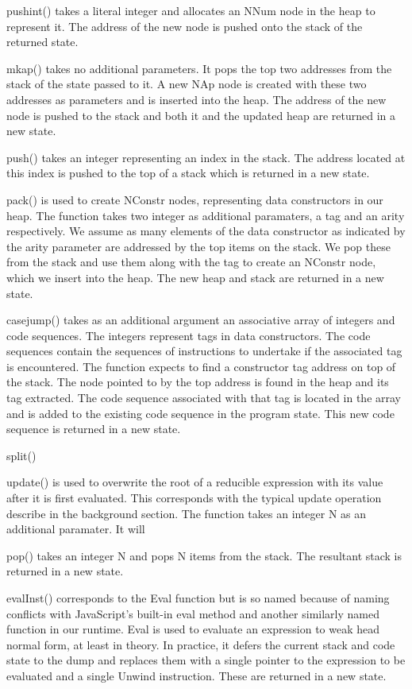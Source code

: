 pushint() takes a literal integer and allocates an NNum node
in the heap to represent it. The address of the new node is
pushed onto the stack of the returned state.

mkap() takes no additional parameters. It pops the top two 
addresses from the stack of the state passed to it. A new
NAp node is created with these two addresses as parameters
and is inserted into the heap. The address of the new node
is pushed to the stack and both it and the updated heap
are returned in a new state. 

push() takes an integer representing an index in the stack.
The address located at this index is pushed to the top of
a stack which is returned in a new state.

pack() is used to create NConstr nodes, representing data
constructors in our heap. The function takes two integer
as additional paramaters, a tag and an arity respectively.
We assume as many elements of the data constructor as 
indicated by the arity parameter are addressed by the top
items on the stack. We pop these from the stack and use
them along with the tag to create an NConstr node, which 
we insert into the heap. The new heap and stack are 
returned in a new state.

casejump() takes as an additional argument an associative
array of integers and code sequences. The integers represent
tags in data constructors. The code sequences contain the 
sequences of instructions to undertake if the associated tag
is encountered. The function expects to find a constructor
tag address on top of the stack. The node pointed to by the
top address is found in the heap and its tag extracted. The
code sequence associated with that tag is located in the array
and is added to the existing code sequence in the program
state. This new code sequence is returned in a new state.

split()  

update() is used to overwrite the root of a reducible expression
with its value after it is first evaluated. This corresponds
with the typical update operation describe in the background
section. The function takes an integer N as an additional
paramater. It will 

pop() takes an integer N and pops N items from the stack.
The resultant stack is returned in a new state.

evalInst() corresponds to the Eval function but is so named
because of naming conflicts with JavaScript's built-in eval
method and another similarly named function in our runtime.
Eval is used to evaluate an expression to weak head normal
form, at least in theory. In practice, it defers the current
stack and code state to the dump and replaces them with a
single pointer to the expression to be evaluated and a single
Unwind instruction. These are returned in a new state.

